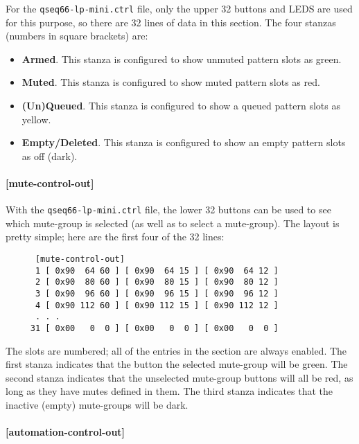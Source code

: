    For the \texttt{qseq66-lp-mini.ctrl} file, only the upper 32 buttons and
   LEDS are used for this purpose, so there are 32 lines of data in this
   section.
   The four stanzas (numbers in square brackets) are:

   \begin{itemize}
      \item \textbf{Armed}.
         This stanza is configured to show unmuted pattern
         slots as green.
      \item \textbf{Muted}.
         This stanza is configured to show muted pattern
         slots as red.
      \item \textbf{(Un)Queued}.
         This stanza is configured to show a queued pattern
         slots as yellow.
      \item \textbf{Empty/Deleted}.
         This stanza is configured to show an empty pattern
         slots as off (dark).
   \end{itemize}

\paragraph{[mute-control-out]}
\label{paragraph:patterns_mute_control_out}

   With the \texttt{qseq66-lp-mini.ctrl} file, the lower 32 buttons can be used
   to see which mute-group is selected (as well as to select a mute-group).
   The layout is pretty simple; here are the first four of the 32 lines:

   \begin{verbatim}
      [mute-control-out]
      1 [ 0x90  64 60 ] [ 0x90  64 15 ] [ 0x90  64 12 ]
      2 [ 0x90  80 60 ] [ 0x90  80 15 ] [ 0x90  80 12 ]
      3 [ 0x90  96 60 ] [ 0x90  96 15 ] [ 0x90  96 12 ]
      4 [ 0x90 112 60 ] [ 0x90 112 15 ] [ 0x90 112 12 ]
      . . .
     31 [ 0x00   0  0 ] [ 0x00   0  0 ] [ 0x00   0  0 ]
   \end{verbatim}

   The slots are numbered; all of the entries in the section are always
   enabled.  The first stanza indicates that the button the selected mute-group
   will be green.  The second stanza indicates that the unselected mute-group
   buttons will all be red, as long as they have mutes defined in them.  The
   third stanza indicates that the inactive (empty) mute-groups will be dark.

\paragraph{[automation-control-out]}
\label{paragraph:patterns_automation_control_out}

